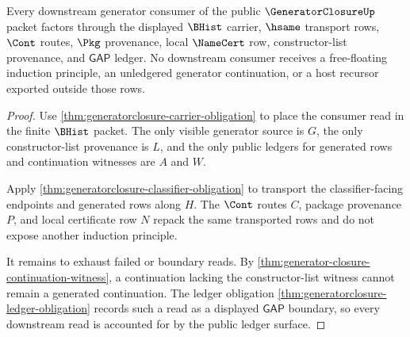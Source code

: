 \begin{theorem}
\label{thm:generatorclosure-downstream-ledger-exhaustion}
Every downstream generator consumer of the public $\GeneratorClosureUp$ packet factors through the displayed $\BHist$ carrier, $\hsame$ transport rows, $\Cont$ routes, $\Pkg$ provenance, local $\NameCert$ row, constructor-list provenance, and $\mathsf{GAP}$ ledger. No downstream consumer receives a free-floating induction principle, an unledgered generator continuation, or a host recursor exported outside those rows.
\end{theorem}
\begin{proof}
Use \autoref{thm:generatorclosure-carrier-obligation} to place the consumer read in the finite $\BHist$ packet. The only visible generator source is $G$, the only constructor-list provenance is $L$, and the only public ledgers for generated rows and continuation witnesses are $A$ and $W$.

Apply \autoref{thm:generatorclosure-classifier-obligation} to transport the classifier-facing endpoints and generated rows along $H$. The $\Cont$ routes $C$, package provenance $P$, and local certificate row $N$ repack the same transported rows and do not expose another induction principle.

It remains to exhaust failed or boundary reads. By \autoref{thm:generator-closure-continuation-witness}, a continuation lacking the constructor-list witness cannot remain a generated continuation. The ledger obligation \autoref{thm:generatorclosure-ledger-obligation} records such a read as a displayed $\mathsf{GAP}$ boundary, so every downstream read is accounted for by the public ledger surface.
\end{proof}

